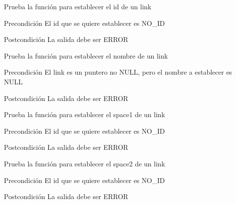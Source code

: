 \begin{DoxyRefList}
\item[\label{test__test000131}%
\hypertarget{test__test000131}{}%
Global \hyperlink{link__test_8c_ac4d98b2913728aeb1fe6735ac96bb25a}{test3\-\_\-link\-\_\-set\-\_\-id} ()]Prueba la función para establecer el id de un link \begin{DoxyPrecond}{Precondición}
El id que se quiere establecer es N\-O\-\_\-\-I\-D 
\end{DoxyPrecond}
\begin{DoxyPostcond}{Postcondición}
La salida debe ser E\-R\-R\-O\-R  
\end{DoxyPostcond}

\item[\label{test__test000134}%
\hypertarget{test__test000134}{}%
Global \hyperlink{link__test_8c_a8396e33f601deb52c940cb89cd7c6bfe}{test3\-\_\-link\-\_\-set\-\_\-name} ()]Prueba la función para establecer el nombre de un link \begin{DoxyPrecond}{Precondición}
El link es un puntero no N\-U\-L\-L, pero el nombre a establecer es N\-U\-L\-L 
\end{DoxyPrecond}
\begin{DoxyPostcond}{Postcondición}
La salida debe ser E\-R\-R\-O\-R  
\end{DoxyPostcond}

\item[\label{test__test000137}%
\hypertarget{test__test000137}{}%
Global \hyperlink{link__test_8c_a6055f63d81cafacc3946876cd5a12976}{test3\-\_\-link\-\_\-set\-\_\-space1} ()]Prueba la función para establecer el space1 de un link \begin{DoxyPrecond}{Precondición}
El id que se quiere establecer es N\-O\-\_\-\-I\-D 
\end{DoxyPrecond}
\begin{DoxyPostcond}{Postcondición}
La salida debe ser E\-R\-R\-O\-R  
\end{DoxyPostcond}

\item[\label{test__test000140}%
\hypertarget{test__test000140}{}%
Global \hyperlink{link__test_8c_a009ab3d97ee9b5df6ba610bedeea3b42}{test3\-\_\-link\-\_\-set\-\_\-space2} ()]Prueba la función para establecer el space2 de un link \begin{DoxyPrecond}{Precondición}
El id que se quiere establecer es N\-O\-\_\-\-I\-D 
\end{DoxyPrecond}
\begin{DoxyPostcond}{Postcondición}
La salida debe ser E\-R\-R\-O\-R  
\end{DoxyPostcond}


\end{DoxyRefList}
